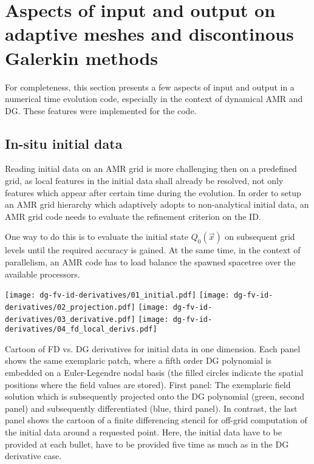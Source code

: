 
\section[
  Aspects of input and output on AMR and DG
]{Aspects of input and output on adaptive meshes and discontinous
  Galerkin methods}
For completeness, this section presents a few aspects of input and output in
a numerical time evolution code, especially in the context of dynamical AMR
and DG. These features were implemented for the  code.

\subsection{In-situ initial data}
Reading initial data on an AMR grid is more challenging then on a predefined
grid, as local features in the initial data shall already be resolved, not only
features which appear after certain time during the evolution. In order to
setup an AMR grid hierarchy which adaptively adopts to non-analytical initial
data, an AMR grid code needs to evaluate the refinement criterion on the ID.

One way to do this is to evaluate the initial state $Q_0(\vec x)$ on subsequent
grid levels until the required accuracy is gained. At the same time, in the
context of parallelism, an AMR code has to load balance the spawned spacetree
over the available processors.

\begin{marginfigure}
	\texttt{[image: dg-fv-id-derivatives/01\_initial.pdf]}
	\texttt{[image: dg-fv-id-derivatives/02\_projection.pdf]}
	\texttt{[image: dg-fv-id-derivatives/03\_derivative.pdf]}
	\texttt{[image: dg-fv-id-derivatives/04\_fd\_local\_derivs.pdf]}
	\caption[
	FV vs DG derivatives for ID, drawn with Inkscape, \exclusive
	]{Cartoon of FD vs. DG derivatives for initial data in one dimension.
		Each panel shows the same exemplaric patch, where a fifth order DG polynomial
		is embedded on a Euler-Legendre nodal basis (\ie the filled circles indicate the
		spatial positions where the field values are stored).
		First panel: The exemplaric field solution which is subsequently projected
		onto the DG polynomial (green, second panel) and subsequently differentiated
		(blue, third panel). In contrast, the last panel shows the cartoon of a
		finite differencing stencil for off-grid computation of the initial data
		around a requested point. Here, the initial data have to be provided at
		each bullet, \ie have to be provided five time as much as in the DG derivative
		case.
	}
	\label{fig:dg-fv-id-derivatives}
\end{marginfigure}

